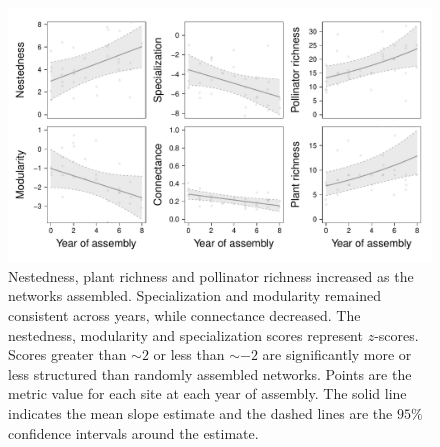 \documentclass[12pt]{article}
\begin{document}
\begin{figure}
  \centering
  \includegraphics[width=1\textwidth]{../analysis/networkLevel/figures/baci.pdf}
  \caption{Nestedness, plant richness and pollinator richness
    increased as the networks assembled. Specialization and modularity
    remained consistent across years, while connectance decreased. The
    nestedness, modularity and specialization scores represent
    $z$-scores. Scores greater than $\sim 2$ or less than $\sim -2$
    are significantly more or less structured than randomly assembled
    networks. Points are the metric value for each site at each year
    of assembly. The solid line indicates the mean slope estimate and
    the dashed lines are the $95\%$ confidence intervals around the
    estimate.}
  \label{fig:baci}
\end{figure}
\clearpage
\end{document}
